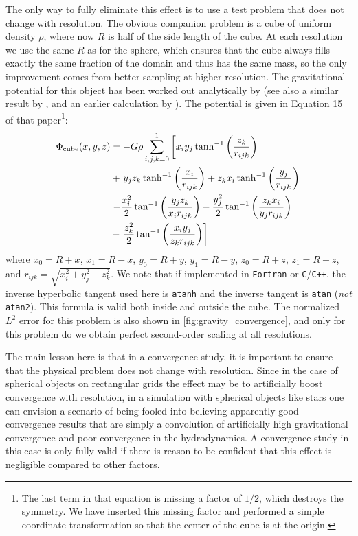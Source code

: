 \documentclass[12pt]{article}
\begin{document}
The only way to fully eliminate this effect is to use a test problem that
does not change with resolution. The obvious companion problem is a cube of
uniform density $\rho$, where now $R$ is half of the side length of
the cube. At each resolution we use the same $R$ as for the sphere,
which ensures that the cube always fills exactly the same fraction of
the domain and thus has the same mass, so the only improvement comes
from better sampling at higher resolution. The gravitational potential for this
object has been worked out analytically by \citet{waldvogel:1976} (see
also a similar result by \citet{hummer:1996}, and an earlier calculation 
by \citet{macmillan:1958}). The potential is given in
Equation 15 of that paper\footnote{The last term in that equation is missing a factor of
$1/2$, which destroys the symmetry. We have inserted this missing factor and
performed a simple coordinate transformation so that the center of
the cube is at the origin.}:
\begin{align}
  \Phi_{\text{cube}}(x,y,z) &= -G\rho\sum_{i,j,k=0}^1\left[x_i y_j\, \text{tanh}^{-1}\left(\frac{z_k}{r_{ijk}}\right)\right. \notag \\
  &+ \left. y_j z_k\, \text{tanh}^{-1}\left(\frac{x_i}{r_{ijk}}\right) + z_k x_i\, \text{tanh}^{-1}\left(\frac{y_j}{r_{ijk}}\right) \right.\notag \\
  &\left. - \frac{x_i^2}{2}\,\text{tan}^{-1}\left(\frac{y_j z_k}{x_i r_{ijk}}\right) - \frac{y_j^2}{2}\,\text{tan}^{-1}\left(\frac{z_k x_i}{y_j r_{ijk}}\right) \right. \notag \\
  &- \left. \frac{z_k^2}{2}\,\text{tan}^{-1}\left(\frac{x_i y_j}{z_k r_{ijk}}\right)\right]
\end{align}
where $x_0 = R + x$, $x_1 = R - x$, $y_0 = R + y$, 
$y_1 = R - y$, $z_0 = R + z$, $z_1 = R - z$, 
and $r_{ijk} = \sqrt{x_i^2 + y_j^2 + z_k^2}$. We note that if implemented in 
\texttt{Fortran} or \texttt{C}/\texttt{C++}, the inverse hyperbolic tangent used here is
\texttt{atanh} and the inverse tangent is \texttt{atan} (\textit{not}
\texttt{atan2}). This formula is valid both inside and outside the
cube. The normalized $L^2$ error for this problem is also shown
in \autoref{fig:gravity_convergence}, and only for this problem 
do we obtain perfect second-order scaling at all resolutions.

The main lesson here is that in a convergence study, it is important
to ensure that the physical problem does not change with
resolution. Since in the case of spherical objects on rectangular
grids the effect may be to artificially boost convergence with resolution,
in a simulation with spherical objects like stars one can envision a
scenario of being fooled into believing apparently good convergence
results that are simply a convolution of artificially high
gravitational convergence and poor convergence in the hydrodynamics. A
convergence study in this case is only fully valid if there is reason
to be confident that this effect is negligible compared to other
factors.
\end{document}
